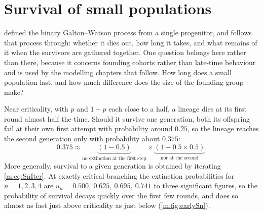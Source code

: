 \renewcommand{\thesection}{\thechapter.\Alph{section}}
\setcounter{section}{0}

\section{Survival of small populations}
\label{m:app:smallpops}

 defined the binary Galton--Watson process from a single
progenitor, and \ChA{} follows that process through: whether it dies out, how
long it takes, and what remains of it when the survivors are gathered together.
One question belongs here rather than there, because it concerns founding cohorts
rather than late-time behaviour and is used by the modelling chapters that follow.
How long does a small population last, and how much difference does the size of
the founding group make?

Near criticality, with $p$ and $1-p$ each close to a half, a lineage dies at its
first round almost half the time. Should it survive one generation, both its
offspring fail at their own first attempt with probability around $0.25$, so the
lineage reaches the second generation only with probability about $0.375$:
\begin{equation*}
0.375\approx
\underbrace{(1-0.5)}_{\text{no extinction at the first step}}\times
\underbrace{(1-0.5\times0.5)}_{\text{nor at the second}} .
\end{equation*}
More generally, survival to a given generation is obtained by iterating
\cref{m:eq:SnIter}. At exactly critical branching the extinction probabilities for
$n=1,2,3,4$ are $u_n = 0.500,\ 0.625,\ 0.695,\ 0.741$ to three significant figures,
so the probability of survival decays quickly over the first few rounds, and does
so almost as fast just above criticality as just below (\cref{m:fig:earlySn}).

